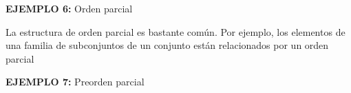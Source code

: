 \documentclass[a5paper,doc,10pt,noapacite]{apa6}
\begin{document}
{{\vspace{1\baselineskip}
\textbf{EJEMPLO 6:} Orden parcial

\begin{figure}[H]
\begin{floatrow}
	\fontsize{7}{11}\selectfont
	\captionsetup{justification=centering, labelfont=footnotesize, font=footnotesize}
\end{floatrow}
\end{figure}

\vspace{-2\baselineskip}
La estructura de orden parcial es bastante común. Por ejemplo, los elementos de una familia de subconjuntos de un conjunto están relacionados por un orden parcial

\vspace{1\baselineskip}
\textbf{EJEMPLO 7:} Preorden parcial

}}
\end{document}
